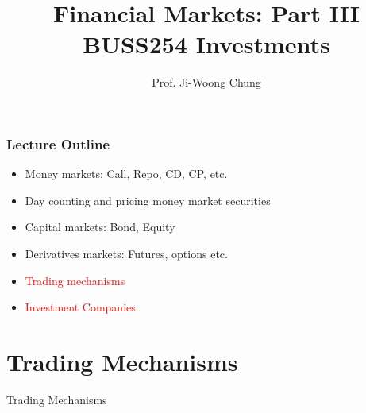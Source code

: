 \documentclass[10pt]{beamer}
\title{Financial Markets: Part III \\
	\vspace{5pt} {\footnotesize BUSS254 Investments}}
\author{Prof. Ji-Woong Chung}
\institute{}
\date{}
\begin{document}
	
	\frame{\titlepage}
	\graphicspath{{figures//}}
	
	
	\begin{frame}
		\frametitle{Lecture Outline}
		\begin{itemize}\itemsep15pt
			\item Money markets: Call, Repo, CD, CP, etc.
			\item Day counting and pricing money market securities
			\item Capital markets: Bond, Equity
			\item Derivatives markets: Futures, options etc.
			
			\item \textcolor{red}{Trading mechanisms}
			\item \textcolor{red}{Investment Companies}
		\end{itemize}
	\end{frame}
	
	
	
	\section{Trading Mechanisms}
	\begin{frame}
		\begin{center}
			{\Large Trading Mechanisms}
		\end{center}
	\end{frame}
	
	
	
	
	
\end{document}
